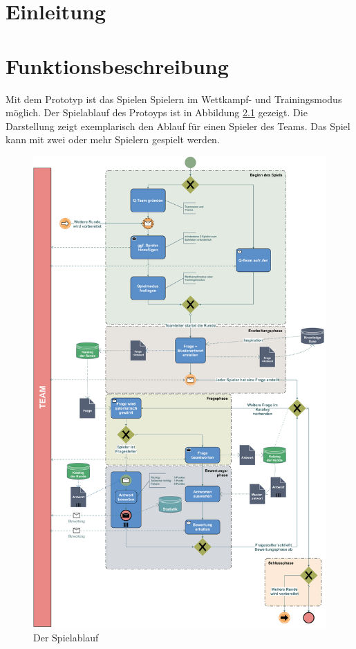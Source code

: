 \documentclass[a4paper,11pt,listof=numbered,glossary=totoc,parskip=half,toc=bib]{scrreprt}
\begin{document}
	\newpage
	\renewcommand \thechapter{\arabic{chapter}}
	\setcounter{chapter}{0}
	
	\chapter{Einleitung}
	
	\chapter{Funktionsbeschreibung}
	Mit dem Prototyp ist das Spielen Spielern im Wettkampf- und Trainingsmodus möglich. Der Spielablauf des Protoyps ist in Abbildung \ref{fig:bpmn} gezeigt. 
	Die Darstellung zeigt exemplarisch den Ablauf für einen Spieler des Teams. Das Spiel kann mit zwei oder mehr Spielern gespielt werden. 
		
	\begin{figure}
		\centering
		\includegraphics[width=\textwidth]{bpmn_IST.png}
		\caption{Der Spielablauf}
		\label{fig:bpmn}
	\end{figure}
	
\end{document}
